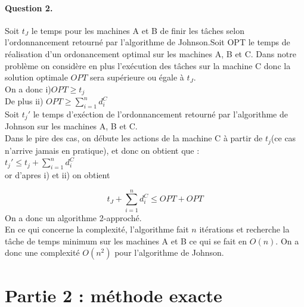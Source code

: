 \documentclass[a4paper, 10pt]{article}
\begin{document}
	\paragraph{Question 2.}{Soit $t_J$ le temps pour les machines A et B de finir les tâches selon l'ordonnancement retourné par l'algorithme de Johnson.Soit OPT le temps de réalisation d'un ordonancement optimal sur les machines A, B et C.
          Dans notre problème on considère en plus l'exécution des tâches sur la machine C donc la solution optimale $OPT$ sera supérieure ou égale à $t_J$. \\
          On a donc i)$OPT \geq t_j$ \\
          De plus   ii) $OPT \geq \sum_{i=1}^n d_i^C$ \\
          Soit $t_j'$ le temps d'exéction de l'ordonnancement retourné par l'algorithme de Johnson sur les machines A, B et C. \\
          Dans le pire des cas, on débute les actions de la machine C à partir de $t_j$(ce cas n'arrive jamais en pratique), et donc on obtient que : \\
          $t_j' \le t_j + \sum_{i=1}^n d_i^C$ \\
          or d'apres i) et ii) on obtient
          
          
		\begin{equation*}
			t_J + \sum_{i=1}^n d_i^C \le OPT + OPT
		\end{equation*}
		On a donc un algorithme 2-approché.\\[0.35cm]
		En ce qui concerne la complexité, l'algorithme fait $n$ itérations et recherche la tâche de temps minimum sur les machines A et B ce qui se fait en $O(n)$. On a donc une complexité $O(n^2)$ pour l'algorithme de Johnson.
		}
		
	\section*{Partie 2 : méthode exacte}
		
\end{document}
